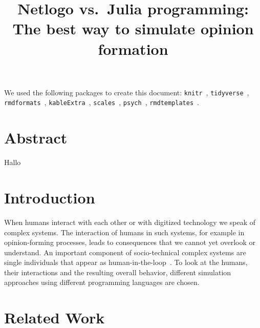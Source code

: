 \documentclass[runningheads]{llncs}
\begin{document}
%
\title{Netlogo vs.~Julia programming: The best way to simulate opinion
formation}
%
%


%
\maketitle              %
%
\begin{abstract}

\end{abstract}
%
%
%
We used the following packages to create this document:
\texttt{knitr}~\autocite{R-knitr},
\texttt{tidyverse}~\autocite{R-tidyverse},
\texttt{rmdformats}~\autocite{R-rmdformats},
\texttt{kableExtra}~\autocite{R-kableExtra},
\texttt{scales}~\autocite{R-scales}, \texttt{psych}~\autocite{R-psych},
\texttt{rmdtemplates}~\autocite{R-rmdtemplates}.

\hypertarget{abstract}{%
\section{Abstract}\label{abstract}}

Hallo

\hypertarget{introduction}{%
\section{Introduction}\label{introduction}}

When humans interact with each other or with digitized technology we
speak of complex systems. The interaction of humans in such systems, for
example in opinion-forming processes, leads to consequences that we
cannot yet overlook or understand. An important component of
socio-technical complex systems are single individuals that appear as
human-in-the-loop~\autocite{Valdez2018human}. To look at the humans,
their interactions and the resulting overall behavior, different
simulation approaches using different programming languages are chosen.

\hypertarget{related-work}{%
\section{Related Work}\label{related-work}}
\end{document}
